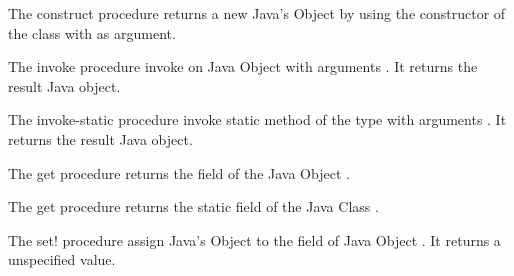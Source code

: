 \begin{entry}{%
}

The {\cf construct} procedure returns a new Java's Object by using the constructor of the class  with  as argument.

\end{entry}



\begin{entry}{%
}

The {\cf invoke} procedure invoke  on Java Object  with arguments . It returns the result Java object.

\end{entry}



\begin{entry}{%
}

The {\cf invoke-static} procedure invoke static method  of the type  with arguments . It returns the result Java object.

\end{entry}



\begin{entry}{%
}

The {\cf get} procedure returns the field  of the Java Object .

\end{entry}



\begin{entry}{%
}

The {\cf get} procedure returns the static field  of the Java Class .
\end{entry}



\begin{entry}{%
}

The {\cf set!} procedure assign Java's Object  to the field  of Java Object . It returns a unspecified value.

\end{entry}




